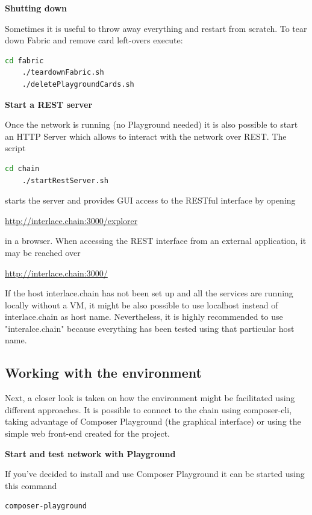 \textbf{Shutting down}

Sometimes it is useful to throw away everything and restart from scratch. To tear down Fabric and remove card left-overs execute:

\begin{lstlisting}[language=bash]
	cd fabric
	./teardownFabric.sh
	./deletePlaygroundCards.sh
\end{lstlisting}

\textbf{Start a REST server}

Once the network is running (no Playground needed) it is also possible to start an HTTP Server which allows to interact with the network over REST. The script

\begin{lstlisting}[language=bash]
	cd chain
	./startRestServer.sh
\end{lstlisting}

starts the server and provides GUI access to the RESTful interface by opening

\url{http://interlace.chain:3000/explorer}

in a browser. When accessing the REST interface from an external application, it may be reached over

\url{http://interlace.chain:3000/}

If the host interlace.chain has not been set up and all the services are running locally without a VM, it might be also possible to use localhost instead of interlace.chain as host name. Nevertheless, it is highly recommended to use "interalce.chain" because everything has been tested using that particular host name.

\subsection{Working with the environment}

Next, a closer look is taken on how the environment might be facilitated using different approaches. It is possible to connect to the chain using composer-cli, taking advantage of Composer Playground (the graphical interface) or using the simple web front-end created for the project.

\textbf{Start and test network with Playground}

If you've decided to install and use Composer Playground it can be started using this command

\begin{lstlisting}[language=bash]
	composer-playground
\end{lstlisting}

